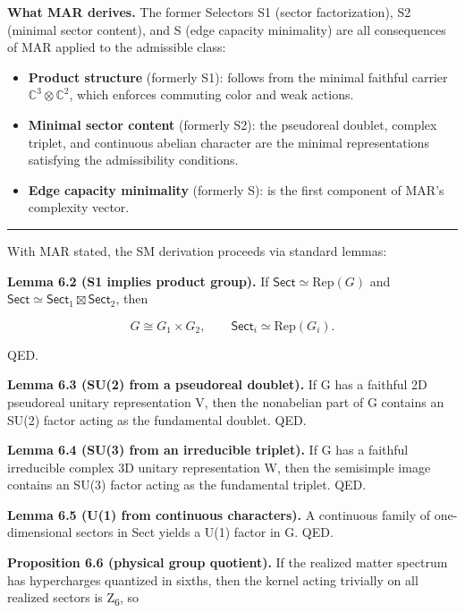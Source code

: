 \documentclass[11pt,a4paper]{article}
\theoremstyle{remark}
\providecommand{\tightlist}{%
  \setlength{\itemsep}{0pt}\setlength{\parskip}{0pt}}
\begin{document}
\textbf{What MAR derives.} The former Selectors S1 (sector factorization), S2
(minimal sector content), and S (edge capacity minimality) are all consequences
of MAR applied to the admissible class:

\begin{itemize}
\tightlist
\item
  \textbf{Product structure} (formerly S1): follows from the minimal faithful carrier
  \(\mathbb{C}^3 \otimes \mathbb{C}^2\), which enforces commuting color and weak
  actions.
\item
  \textbf{Minimal sector content} (formerly S2): the pseudoreal doublet, complex
  triplet, and continuous abelian character are the minimal representations
  satisfying the admissibility conditions.
\item
  \textbf{Edge capacity minimality} (formerly S): is the first component of MAR's
  complexity vector.
\end{itemize}

\begin{center}\rule{0.5\linewidth}{0.5pt}\end{center}

With MAR stated, the SM derivation proceeds via standard lemmas:

\textbf{Lemma 6.2 (S1 implies product group).} If
\(\mathsf{Sect} \simeq \mathrm{Rep}(G)\) and
\(\mathsf{Sect} \simeq \mathsf{Sect}_1 \boxtimes \mathsf{Sect}_2\),
then

\[
G \cong G_1 \times G_2,
\qquad
\mathsf{Sect}_i \simeq \mathrm{Rep}(G_i).
\]

QED.

\textbf{Lemma 6.3 (SU(2) from a pseudoreal doublet).} If G has a faithful
2D pseudoreal unitary representation V, then the nonabelian part of G
contains an SU(2) factor acting as the fundamental doublet. QED.

\textbf{Lemma 6.4 (SU(3) from an irreducible triplet).} If G has a faithful
irreducible complex 3D unitary representation W, then the semisimple image
contains an SU(3) factor acting as the fundamental triplet. QED.

\textbf{Lemma 6.5 (U(1) from continuous characters).} A continuous family of
one-dimensional sectors in Sect yields a U(1) factor in G. QED.

\textbf{Proposition 6.6 (physical group quotient).} If the realized matter
spectrum has hypercharges quantized in sixths, then the kernel acting
trivially on all realized sectors is Z\textsubscript{6}, so
\end{document}
